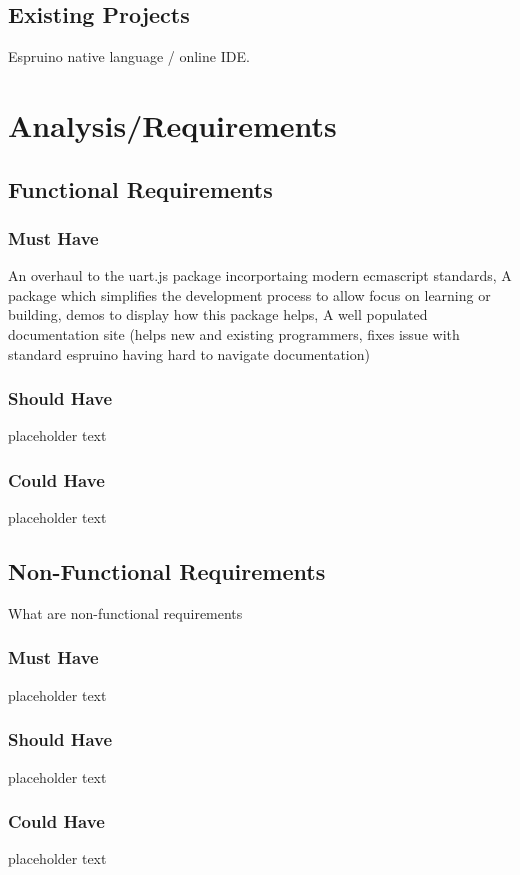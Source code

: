 \documentclass{l4proj}
\begin{document}
\section{Existing Projects}
\text Espruino native language / online IDE.

\chapter{Analysis/Requirements}
\section{Functional Requirements}
\subsection{Must Have}
\text An overhaul to the uart.js package incorportaing modern ecmascript standards, A package which simplifies the development process to allow focus on learning or building, demos to display how this package helps, A well populated documentation site (helps new and existing programmers, fixes issue with standard espruino having hard to navigate documentation)
\subsection{Should Have}
\text placeholder text
\subsection{Could Have}
\text placeholder text
\section{Non-Functional Requirements}
\text What are non-functional requirements
\subsection{Must Have}
\text placeholder text
\subsection{Should Have}
\text placeholder text
\subsection{Could Have}
\text placeholder text
\end{document}
